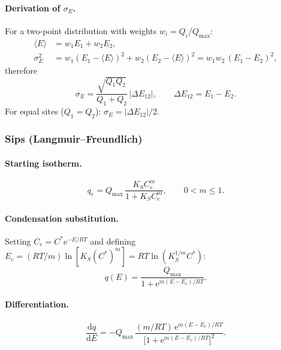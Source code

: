 \documentclass[journal=jacsat,manuscript=article]{achemso}
\begin{document}
\paragraph{Derivation of $\sigma_E$.}
For a two-point distribution with weights $w_i = Q_i/Q_{\max}$:
\begin{align}
	\langle E \rangle &= w_1 E_1 + w_2 E_2, \\
	\sigma_E^2 &= w_1(E_1-\langle E\rangle)^2 + w_2(E_2-\langle E\rangle)^2
	           = w_1 w_2\,(E_1-E_2)^2,
\end{align}
therefore
\begin{equation}
	\sigma_E = \frac{\sqrt{Q_1 Q_2}}{Q_1+Q_2}\,|\Delta E_{12}|,
	\qquad \Delta E_{12} = E_1 - E_2.
	\label{eq:si_sigmaE_DL}
\end{equation}
For equal sites ($Q_1=Q_2$): $\sigma_E = |\Delta E_{12}|/2$.

\subsubsection{Sips (Langmuir--Freundlich)}
\label{sec:si_sips_dist}

\paragraph{Starting isotherm.}
\begin{equation}
	q_e = Q_{\max}\,\frac{K_S C_e^{m}}{1 + K_S C_e^{m}},
	\qquad 0 < m \leq 1.
\end{equation}

\paragraph{Condensation substitution.}
Setting $C_e = C^{\ast}\mathrm{e}^{-E/RT}$ and defining
$E_c = (RT/m)\ln[K_S(C^{\ast})^{m}] = RT\ln(K_S^{1/m}C^{\ast})$:
\begin{equation}
	q(E) = \frac{Q_{\max}}{1+\mathrm{e}^{m(E-E_c)/RT}}.
\end{equation}

\paragraph{Differentiation.}
\begin{equation}
	\frac{\mathrm{d}q}{\mathrm{d}E}
	= -Q_{\max}\,\frac{(m/RT)\,\mathrm{e}^{m(E-E_c)/RT}}
	           {\bigl[1+\mathrm{e}^{m(E-E_c)/RT}\bigr]^{2}}.
\end{equation}
\end{document}
